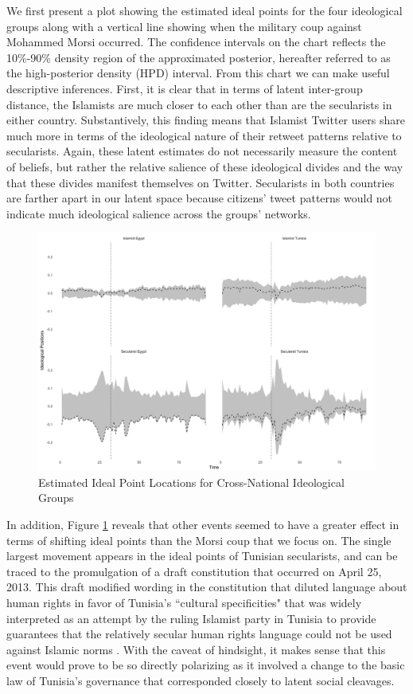 \documentclass[12pt]{article}
\begin{document}
We first present a plot showing the estimated ideal points for the four ideological groups along with a vertical line showing when the military coup against Mohammed Morsi occurred. The confidence intervals on the chart reflects the 10\%-90\% density region of the approximated posterior, hereafter referred to as the high-posterior density (HPD) interval. From this chart we can make useful descriptive inferences. First, it is clear that in terms of latent inter-group distance, the Islamists are much closer to each other than are the secularists in either country. Substantively, this finding means that Islamist Twitter users share much more in terms of the ideological nature of their retweet patterns relative to secularists. Again, these latent estimates do not necessarily measure the content of beliefs, but rather the relative salience of these ideological divides and the way that these divides manifest themselves on Twitter. Secularists in both countries are farther apart in our latent space because citizens' tweet patterns would not indicate much ideological salience across the groups' networks. 
 \begin{figure}[!h]
 	\centering
	\caption{Estimated Ideal Point Locations for Cross-National Ideological Groups}\label{arab_id_facet}
	\centering
	\includegraphics[width=.9\linewidth]{arab_ideology}
\end{figure}

In addition, Figure \ref{arab_id_facet} reveals that other events seemed to have a greater effect in terms of shifting ideal points than the Morsi coup that we focus on. The single largest movement appears in the ideal points of Tunisian secularists, and can be traced to the promulgation of a draft constitution that occurred on April 25, 2013. This draft modified wording in the constitution that diluted language about human rights in favor of Tunisia's ``cultural specificities" that was widely interpreted as an attempt by the ruling Islamist party in Tunisia to provide guarantees that the relatively secular human rights language could not be used against Islamic norms \parencite{hrw2013}. With the caveat of hindsight, it makes sense that this event would prove to be so directly polarizing as it involved a change to the basic law of Tunisia's governance that corresponded closely to latent social cleavages.
\end{document}

